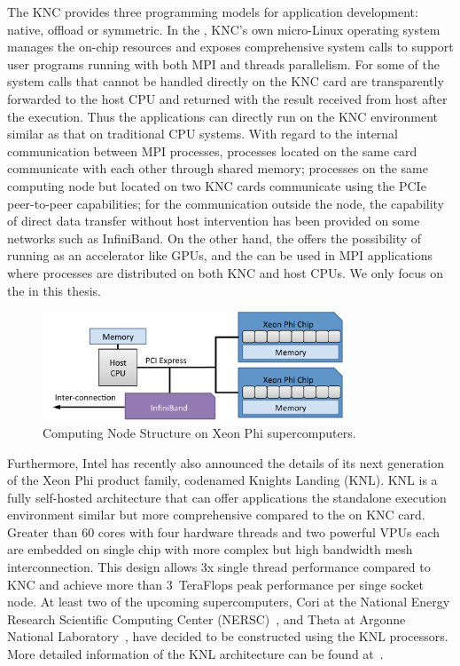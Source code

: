 The KNC provides three programming models for application
development: native, offload or symmetric. In the , KNC's
own micro-Linux operating system manages the on-chip resources and exposes
comprehensive system calls to support user programs running with both MPI
and threads parallelism. For some of the system calls that cannot be handled
directly on the KNC card are transparently forwarded to the host CPU and
returned with the result received from host after the execution.
Thus the applications can directly run on the KNC environment similar as
that on traditional CPU systems. With regard to the internal communication
between MPI processes,  processes located on the same card communicate
with each other through shared memory; processes on the same computing node
but located on two KNC cards communicate using the PCIe peer-to-peer
capabilities; for the communication outside the node, the capability of
direct data transfer without host intervention has been provided on some
networks such as InfiniBand. On the other hand, the 
offers the possibility of running as an accelerator like GPUs, and
the  can be used in MPI applications where processes
are distributed on both KNC and host CPUs. We only focus on the  in this thesis.

\begin{figure}[ht]
\centering
\includegraphics[width=0.8\textwidth]{figures/background/arch-mic-node.pdf}
\caption{Computing Node Structure on Xeon Phi supercomputers.}
\label{fig:arch-mic-node}
\end{figure}

Furthermore, Intel has recently also announced the details of its next
generation of the Xeon Phi product family, codenamed Knights Landing (KNL).
KNL is a fully self-hosted architecture that can offer applications the
standalone execution environment similar but more comprehensive compared
to the  on KNC card. Greater than 60
cores with four hardware threads and two powerful VPUs each are embedded
on single chip with more complex but high bandwidth mesh interconnection.
This design allows 3x single thread performance compared to KNC and achieve
more than 3~TeraFlops peak performance per singe socket node. At least
two of the upcoming supercomputers, Cori at the National Energy Research
Scientific Computing Center (NERSC)~\cite{cori}, and Theta at Argonne National
Laboratory~\cite{theta}, have decided to be constructed using the KNL
processors. More detailed information of the KNL architecture can be found
at~\cite{knl}.


